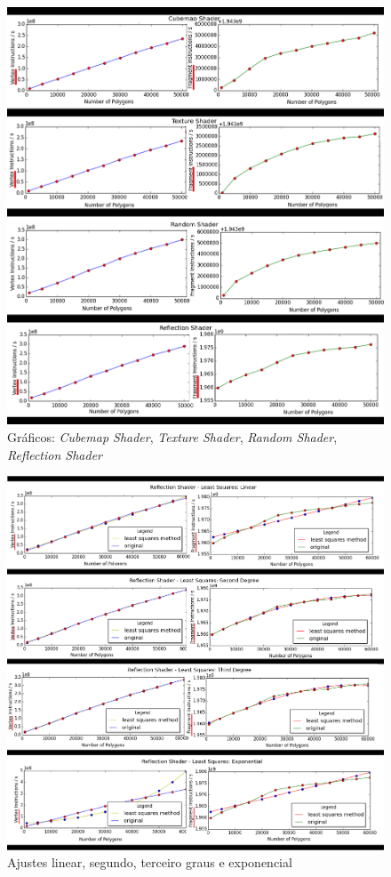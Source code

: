  
	\begin{figure}[ht]
	\centering
		\includegraphics[keepaspectratio=true,scale=0.55]{figuras/cubeplot.png}
	\caption{Gráficos: \textit{Cubemap Shader}, \textit{Texture Shader}, \textit{Random Shader}, \textit{Reflection Shader}}
	\label{plotrefl}
	\end{figure}


	\begin{figure}[ht]
	\centering
		\includegraphics[keepaspectratio=true,scale=0.4]{figuras/reflectionlinear.png}
	\caption{Ajustes linear, segundo, terceiro graus e exponencial}
	\label{linear}
	\end{figure}	
	
